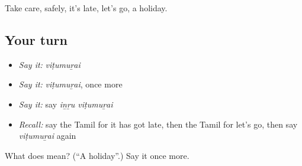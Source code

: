 \begin{grammarlens}[title={What you've built}]
Take care, safely, it's late, let's go, a holiday.
\end{grammarlens}

\subsection*{Your turn}
\begin{itemize}
\raggedright
  \item \emph{Say it:} \emph{viṭumuṟai}
  \item \emph{Say it:} \emph{viṭumuṟai}, once more
  \item \emph{Say it:} say \emph{iṉṟu viṭumuṟai}
  \item \emph{Recall:} say the Tamil for it has got late, then the Tamil for let's go, then say \emph{viṭumuṟai} again
\end{itemize}

\begin{tcolorbox}[breakable,colback=teal!4,colframe=teal!35!black,title={Before you move on}]
What does  mean? (\textquotedblleft{}A holiday\textquotedblright{}.) Say it once more.
\end{tcolorbox}
